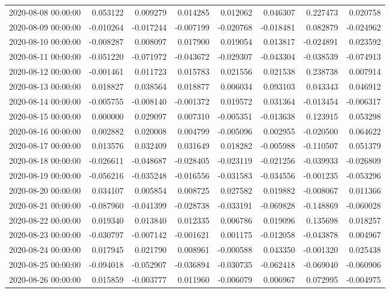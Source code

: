 \begin{tabular}{lrrrrrrr}
2020-08-08 00:00:00 & 0.053122 & 0.009279 & 0.014285 & 0.012062 & 0.046307 & 0.227473 & 0.020758 \\
2020-08-09 00:00:00 & -0.010264 & -0.017244 & -0.007199 & -0.020768 & -0.018481 & 0.082879 & -0.024962 \\
2020-08-10 00:00:00 & -0.008287 & 0.008097 & 0.017900 & 0.019054 & 0.013817 & -0.024891 & 0.023592 \\
2020-08-11 00:00:00 & -0.051220 & -0.071972 & -0.043672 & -0.029307 & -0.043304 & -0.038539 & -0.074913 \\
2020-08-12 00:00:00 & -0.001461 & 0.011723 & 0.015783 & 0.021556 & 0.021538 & 0.238738 & 0.007914 \\
2020-08-13 00:00:00 & 0.018827 & 0.038564 & 0.018877 & 0.006034 & 0.093103 & 0.043343 & 0.046912 \\
2020-08-14 00:00:00 & -0.005755 & -0.008140 & -0.001372 & 0.019572 & 0.031364 & -0.013454 & -0.006317 \\
2020-08-15 00:00:00 & 0.000000 & 0.029097 & 0.007310 & -0.005351 & -0.013638 & 0.123915 & 0.053298 \\
2020-08-16 00:00:00 & 0.002882 & 0.020008 & 0.004799 & -0.005096 & 0.002955 & -0.020500 & 0.064622 \\
2020-08-17 00:00:00 & 0.013576 & 0.032409 & 0.031649 & 0.018282 & -0.005988 & -0.110507 & 0.051379 \\
2020-08-18 00:00:00 & -0.026611 & -0.048687 & -0.028405 & -0.023119 & -0.021256 & -0.039933 & -0.026809 \\
2020-08-19 00:00:00 & -0.056216 & -0.035248 & -0.016556 & -0.031583 & -0.034556 & -0.001235 & -0.053296 \\
2020-08-20 00:00:00 & 0.034107 & 0.005854 & 0.008725 & 0.027582 & 0.019882 & -0.008067 & 0.011366 \\
2020-08-21 00:00:00 & -0.087960 & -0.041399 & -0.028738 & -0.033191 & -0.069828 & -0.148869 & -0.060028 \\
2020-08-22 00:00:00 & 0.019340 & 0.013840 & 0.012335 & 0.006786 & 0.019096 & 0.135698 & 0.018257 \\
2020-08-23 00:00:00 & -0.030797 & -0.007142 & -0.001621 & 0.001175 & -0.012058 & -0.043878 & 0.004967 \\
2020-08-24 00:00:00 & 0.017945 & 0.021790 & 0.008961 & -0.000588 & 0.043350 & -0.001320 & 0.025438 \\
2020-08-25 00:00:00 & -0.094018 & -0.052907 & -0.036894 & -0.030735 & -0.062418 & -0.069040 & -0.060906 \\
2020-08-26 00:00:00 & 0.015859 & -0.003777 & 0.011960 & -0.006079 & 0.006967 & 0.072995 & -0.004975 \\

\end{tabular}
